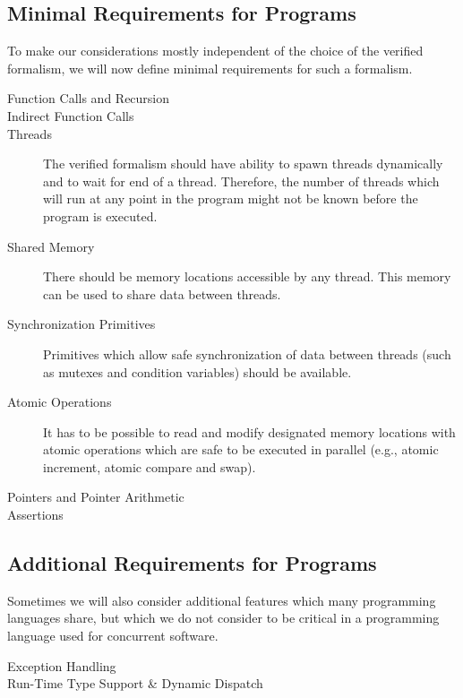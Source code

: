 \subsection{Minimal Requirements for Programs}

To make our considerations mostly independent of the choice of the verified formalism, we will now define minimal requirements for such a formalism.

\begin{description}
    \item[Function Calls and Recursion]
    \item[Indirect Function Calls]
    \item[Threads] The verified formalism should have ability to spawn threads dynamically and to wait for end of a thread.
        Therefore, the number of threads which will run at any point in the program might not be known before the program is executed.
    \item[Shared Memory] There should be memory locations accessible by any thread. This memory can be used to share data between threads.
    \item[Synchronization Primitives] Primitives which allow safe synchronization of data between threads (such as mutexes and condition variables) should be available.
    \item[Atomic Operations] It has to be possible to read and modify designated memory locations with atomic operations which are safe to be executed in parallel (e.g., atomic increment, atomic compare and swap).
    \item[Pointers and Pointer Arithmetic]
    \item[Assertions]
\end{description}

\subsection{Additional Requirements for Programs}

Sometimes we will also consider additional features which many programming languages share, but which we do not consider to be critical in a programming language used for concurrent software.

\begin{description}
    \item[Exception Handling]
    \item[Run-Time Type Support \& Dynamic Dispatch]
\end{description}

